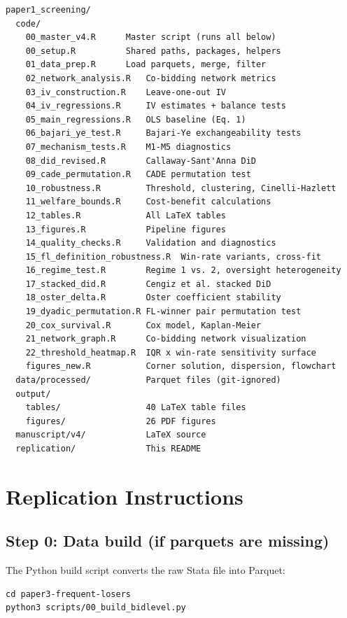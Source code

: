 \documentclass[11pt]{article}
\begin{document}
\begin{verbatim}
paper1_screening/
  code/
    00_master_v4.R      Master script (runs all below)
    00_setup.R          Shared paths, packages, helpers
    01_data_prep.R      Load parquets, merge, filter
    02_network_analysis.R   Co-bidding network metrics
    03_iv_construction.R    Leave-one-out IV
    04_iv_regressions.R     IV estimates + balance tests
    05_main_regressions.R   OLS baseline (Eq. 1)
    06_bajari_ye_test.R     Bajari-Ye exchangeability tests
    07_mechanism_tests.R    M1-M5 diagnostics
    08_did_revised.R        Callaway-Sant'Anna DiD
    09_cade_permutation.R   CADE permutation test
    10_robustness.R         Threshold, clustering, Cinelli-Hazlett
    11_welfare_bounds.R     Cost-benefit calculations
    12_tables.R             All LaTeX tables
    13_figures.R            Pipeline figures
    14_quality_checks.R     Validation and diagnostics
    15_fl_definition_robustness.R  Win-rate variants, cross-fit
    16_regime_test.R        Regime 1 vs. 2, oversight heterogeneity
    17_stacked_did.R        Cengiz et al. stacked DiD
    18_oster_delta.R        Oster coefficient stability
    19_dyadic_permutation.R FL-winner pair permutation test
    20_cox_survival.R       Cox model, Kaplan-Meier
    21_network_graph.R      Co-bidding network visualization
    22_threshold_heatmap.R  IQR x win-rate sensitivity surface
    figures_new.R           Corner solution, dispersion, flowchart
  data/processed/           Parquet files (git-ignored)
  output/
    tables/                 40 LaTeX table files
    figures/                26 PDF figures
  manuscript/v4/            LaTeX source
  replication/              This README
\end{verbatim}

\section{Replication Instructions}

\subsection{Step 0: Data build (if parquets are missing)}

The Python build script converts the raw Stata file into Parquet:

\begin{verbatim}
cd paper3-frequent-losers
python3 scripts/00_build_bidlevel.py
\end{verbatim}
\end{document}
